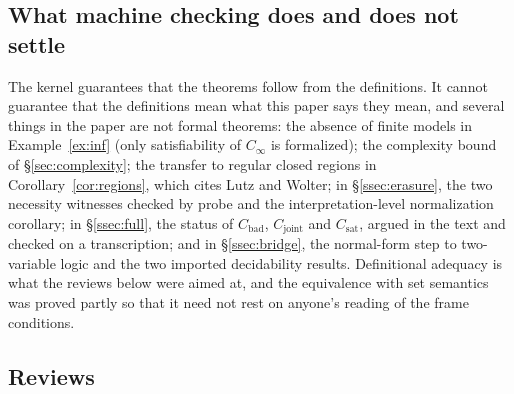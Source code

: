 \documentclass[11pt]{article}
\theoremstyle{plain}
\theoremstyle{definition}
\begin{document}
\subsection{What machine checking does and does not settle}

The kernel guarantees that the theorems follow from the definitions. It cannot
guarantee that the definitions mean what this paper says they mean, and several
things in the paper are not formal theorems: the absence of finite models in
Example~\ref{ex:inf} (only satisfiability of $C_\infty$ is formalized); the
complexity bound of \S\ref{sec:complexity}; the transfer to regular closed
regions in Corollary~\ref{cor:regions}, which cites Lutz and Wolter; in
\S\ref{ssec:erasure}, the two necessity witnesses checked by probe and the
interpretation-level normalization corollary; in \S\ref{ssec:full}, the status
of $C_{\mathrm{bad}}$, $C_{\mathrm{joint}}$ and $C_{\mathrm{sat}}$, argued in
the text and checked on a transcription; and in \S\ref{ssec:bridge}, the
normal-form step to two-variable logic and the two imported decidability
results.
Definitional adequacy is what the reviews below were aimed at, and the
equivalence with set semantics was proved partly so that it need not rest on
anyone's reading of the frame conditions.

\subsection{Reviews}
\label{ssec:reviews}
\end{document}
